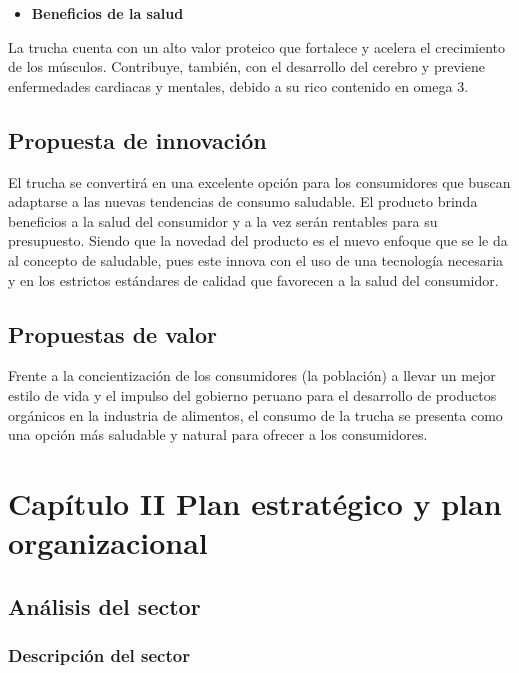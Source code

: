 \documentclass[
  stu,
  floatsintext,
  longtable,
  a4paper,
  nolmodern,
  notxfonts,
  notimes,
  12pt,
  colorlinks=true,linkcolor=blue,citecolor=blue,urlcolor=blue]{apa7}
\providecommand{\tightlist}{%
  \setlength{\itemsep}{0pt}\setlength{\parskip}{0pt}}
\begin{document}
\begin{itemize}
\tightlist
\item
  \textbf{Beneficios de la salud}
\end{itemize}

La trucha cuenta con un alto valor proteico que fortalece y acelera el
crecimiento de los músculos. Contribuye, también, con el desarrollo del
cerebro y previene enfermedades cardiacas y mentales, debido a su rico
contenido en omega 3.

\subsection{Propuesta de innovación}\label{propuesta-de-innovaciuxf3n}

El trucha se convertirá en una excelente opción para los consumidores
que buscan adaptarse a las nuevas tendencias de consumo saludable. El
producto brinda beneficios a la salud del consumidor y a la vez serán
rentables para su presupuesto. Siendo que la novedad del producto es el
nuevo enfoque que se le da al concepto de saludable, pues este innova
con el uso de una tecnología necesaria y en los estrictos estándares de
calidad que favorecen a la salud del consumidor.

\subsection{Propuestas de valor}\label{propuestas-de-valor}

Frente a la concientización de los consumidores (la población) a llevar
un mejor estilo de vida y el impulso del gobierno peruano para el
desarrollo de productos orgánicos en la industria de alimentos, el
consumo de la trucha se presenta como una opción más saludable y natural
para ofrecer a los consumidores.

\section{Capítulo II Plan estratégico y plan
organizacional}\label{capuxedtulo-ii-plan-estratuxe9gico-y-plan-organizacional}

\subsection{Análisis del sector}\label{anuxe1lisis-del-sector}

\subsubsection{Descripción del sector}\label{descripciuxf3n-del-sector}
\end{document}
